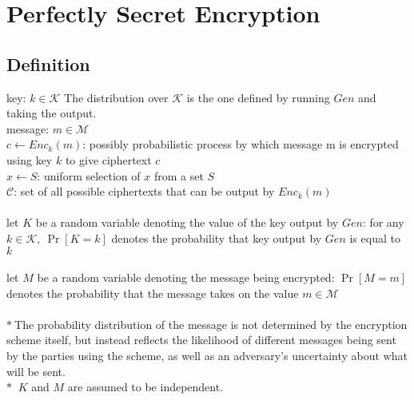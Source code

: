 \section{Perfectly Secret Encryption}

\subsection*{Definition}
key: $k \in \mathcal{K}$ The distribution over $\mathcal{K}$ is 
the one defined by running $Gen$ and taking the output.\\
message: $m \in \mathcal{M}$\\
$c\leftarrow Enc_k(m)$: 
possibly probabilistic process by which 
message m is encrypted using key $k$ to give ciphertext $c$\\
$x \leftarrow S$: uniform selection of $x$ from a set $S$\\
$\mathcal{C}$: set of all possible ciphertexts 
that can be output by $Enc_k(m)$\\\\
let $K$ be a random variable denoting the value of the key output by $Gen$:
for any $k \in \mathcal{K},\ \Pr[K=k]$ denotes the probability that key output
by $Gen$ is equal to $k$\\\\
let $M$ be a random variable denoting the message being encrypted:
$\Pr[M=m]$ denotes the probability that the message takes on the value
$m \in \mathcal{M}$\\\\
$\ast\ $The probability distribution of the message is not 
determined by the encryption scheme itself, but instead reflects the likelihood
 of different messages being sent by the parties using the scheme, as well as an
 adversary’s uncertainty about what will be sent.\\
 $\ast\ $ $K$ and $M$ are assumed to be independent.\\

